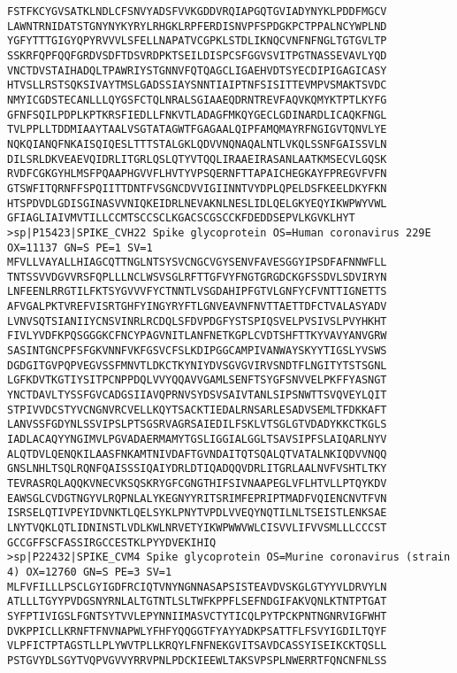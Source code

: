 \documentclass[en,black,12pt,normal]{elegantnote}
\begin{document}
\begin{lstlisting}
FSTFKCYGVSATKLNDLCFSNVYADSFVVKGDDVRQIAPGQTGVIADYNYKLPDDFMGCV
LAWNTRNIDATSTGNYNYKYRYLRHGKLRPFERDISNVPFSPDGKPCTPPALNCYWPLND
YGFYTTTGIGYQPYRVVVLSFELLNAPATVCGPKLSTDLIKNQCVNFNFNGLTGTGVLTP
SSKRFQPFQQFGRDVSDFTDSVRDPKTSEILDISPCSFGGVSVITPGTNASSEVAVLYQD
VNCTDVSTAIHADQLTPAWRIYSTGNNVFQTQAGCLIGAEHVDTSYECDIPIGAGICASY
HTVSLLRSTSQKSIVAYTMSLGADSSIAYSNNTIAIPTNFSISITTEVMPVSMAKTSVDC
NMYICGDSTECANLLLQYGSFCTQLNRALSGIAAEQDRNTREVFAQVKQMYKTPTLKYFG
GFNFSQILPDPLKPTKRSFIEDLLFNKVTLADAGFMKQYGECLGDINARDLICAQKFNGL
TVLPPLLTDDMIAAYTAALVSGTATAGWTFGAGAALQIPFAMQMAYRFNGIGVTQNVLYE
NQKQIANQFNKAISQIQESLTTTSTALGKLQDVVNQNAQALNTLVKQLSSNFGAISSVLN
DILSRLDKVEAEVQIDRLITGRLQSLQTYVTQQLIRAAEIRASANLAATKMSECVLGQSK
RVDFCGKGYHLMSFPQAAPHGVVFLHVTYVPSQERNFTTAPAICHEGKAYFPREGVFVFN
GTSWFITQRNFFSPQIITTDNTFVSGNCDVVIGIINNTVYDPLQPELDSFKEELDKYFKN
HTSPDVDLGDISGINASVVNIQKEIDRLNEVAKNLNESLIDLQELGKYEQYIKWPWYVWL
GFIAGLIAIVMVTILLCCMTSCCSCLKGACSCGSCCKFDEDDSEPVLKGVKLHYT
>sp|P15423|SPIKE_CVH22 Spike glycoprotein OS=Human coronavirus 229E OX=11137 GN=S PE=1 SV=1
MFVLLVAYALLHIAGCQTTNGLNTSYSVCNGCVGYSENVFAVESGGYIPSDFAFNNWFLL
TNTSSVVDGVVRSFQPLLLNCLWSVSGLRFTTGFVYFNGTGRGDCKGFSSDVLSDVIRYN
LNFEENLRRGTILFKTSYGVVVFYCTNNTLVSGDAHIPFGTVLGNFYCFVNTTIGNETTS
AFVGALPKTVREFVISRTGHFYINGYRYFTLGNVEAVNFNVTTAETTDFCTVALASYADV
LVNVSQTSIANIIYCNSVINRLRCDQLSFDVPDGFYSTSPIQSVELPVSIVSLPVYHKHT
FIVLYVDFKPQSGGGKCFNCYPAGVNITLANFNETKGPLCVDTSHFTTKYVAVYANVGRW
SASINTGNCPFSFGKVNNFVKFGSVCFSLKDIPGGCAMPIVANWAYSKYYTIGSLYVSWS
DGDGITGVPQPVEGVSSFMNVTLDKCTKYNIYDVSGVGVIRVSNDTFLNGITYTSTSGNL
LGFKDVTKGTIYSITPCNPPDQLVVYQQAVVGAMLSENFTSYGFSNVVELPKFFYASNGT
YNCTDAVLTYSSFGVCADGSIIAVQPRNVSYDSVSAIVTANLSIPSNWTTSVQVEYLQIT
STPIVVDCSTYVCNGNVRCVELLKQYTSACKTIEDALRNSARLESADVSEMLTFDKKAFT
LANVSSFGDYNLSSVIPSLPTSGSRVAGRSAIEDILFSKLVTSGLGTVDADYKKCTKGLS
IADLACAQYYNGIMVLPGVADAERMAMYTGSLIGGIALGGLTSAVSIPFSLAIQARLNYV
ALQTDVLQENQKILAASFNKAMTNIVDAFTGVNDAITQTSQALQTVATALNKIQDVVNQQ
GNSLNHLTSQLRQNFQAISSSIQAIYDRLDTIQADQQVDRLITGRLAALNVFVSHTLTKY
TEVRASRQLAQQKVNECVKSQSKRYGFCGNGTHIFSIVNAAPEGLVFLHTVLLPTQYKDV
EAWSGLCVDGTNGYVLRQPNLALYKEGNYYRITSRIMFEPRIPTMADFVQIENCNVTFVN
ISRSELQTIVPEYIDVNKTLQELSYKLPNYTVPDLVVEQYNQTILNLTSEISTLENKSAE
LNYTVQKLQTLIDNINSTLVDLKWLNRVETYIKWPWWVWLCISVVLIFVVSMLLLCCCST
GCCGFFSCFASSIRGCCESTKLPYYDVEKIHIQ
>sp|P22432|SPIKE_CVM4 Spike glycoprotein OS=Murine coronavirus (strain 4) OX=12760 GN=S PE=3 SV=1
MLFVFILLLPSCLGYIGDFRCIQTVNYNGNNASAPSISTEAVDVSKGLGTYYVLDRVYLN
ATLLLTGYYPVDGSNYRNLALTGTNTLSLTWFKPPFLSEFNDGIFAKVQNLKTNTPTGAT
SYFPTIVIGSLFGNTSYTVVLEPYNNIIMASVCTYTICQLPYTPCKPNTNGNRVIGFWHT
DVKPPICLLKRNFTFNVNAPWLYFHFYQQGGTFYAYYADKPSATTFLFSVYIGDILTQYF
VLPFICTPTAGSTLLPLYWVTPLLKRQYLFNFNEKGVITSAVDCASSYISEIKCKTQSLL
PSTGVYDLSGYTVQPVGVVYRRVPNLPDCKIEEWLTAKSVPSPLNWERRTFQNCNFNLSS

\end{lstlisting}
\end{document}
